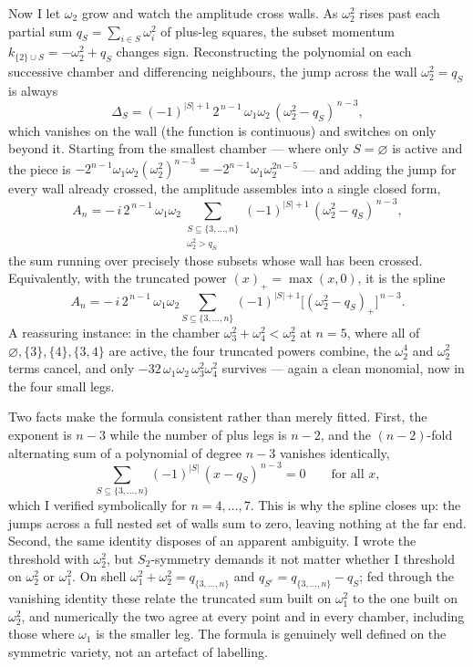 \documentclass[11pt]{article}
\begin{document}
Now I let $\omega_2$ grow and watch the amplitude cross walls. As $\omega_2^2$ rises past each
partial sum $q_S=\sum_{i\in S}\omega_i^2$ of plus-leg squares, the subset momentum
$k_{\{2\}\cup S}=-\omega_2^2+q_S$ changes sign. Reconstructing the polynomial on each successive
chamber and differencing neighbours, the jump across the wall $\omega_2^2=q_S$ is always
\[
\Delta_S=(-1)^{|S|+1}\,2^{\,n-1}\,\omega_1\omega_2\,(\omega_2^2-q_S)^{\,n-3},
\]
which vanishes on the wall (the function is continuous) and switches on only beyond it. Starting
from the smallest chamber --- where only $S=\varnothing$ is active and the piece is
$-2^{n-1}\omega_1\omega_2(\omega_2^2)^{n-3}=-2^{n-1}\omega_1\omega_2^{2n-5}$ --- and adding the
jump for every wall already crossed, the amplitude assembles into a single closed form,
\[
A_n=-\,i\,2^{\,n-1}\,\omega_1\omega_2
\sum_{\substack{S\subseteq\{3,\dots,n\}\\ \omega_2^2>q_S}}
(-1)^{|S|+1}\,(\omega_2^2-q_S)^{\,n-3},
\]
the sum running over precisely those subsets whose wall has been crossed. Equivalently, with the
truncated power $(x)_+=\max(x,0)$, it is the spline
\[
A_n=-\,i\,2^{\,n-1}\,\omega_1\omega_2
\sum_{S\subseteq\{3,\dots,n\}}(-1)^{|S|+1}\big[(\omega_2^2-q_S)_+\big]^{\,n-3}.
\]
A reassuring instance: in the chamber $\omega_3^2+\omega_4^2<\omega_2^2$ at $n=5$, where all of
$\varnothing,\{3\},\{4\},\{3,4\}$ are active, the four truncated powers combine, the $\omega_2^4$
and $\omega_2^2$ terms cancel, and only $-32\,\omega_1\omega_2\,\omega_3^2\omega_4^2$ survives ---
again a clean monomial, now in the four small legs.

Two facts make the formula consistent rather than merely fitted. First, the exponent is $n-3$
while the number of plus legs is $n-2$, and the $(n-2)$-fold alternating sum of a polynomial of
degree $n-3$ vanishes identically,
\[
\sum_{S\subseteq\{3,\dots,n\}}(-1)^{|S|}\,(x-q_S)^{\,n-3}=0\qquad\text{for all }x,
\]
which I verified symbolically for $n=4,\dots,7$. This is why the spline closes up: the jumps
across a full nested set of walls sum to zero, leaving nothing at the far end. Second, the same
identity disposes of an apparent ambiguity. I wrote the threshold with $\omega_2^2$, but
$S_2$-symmetry demands it not matter whether I threshold on $\omega_2^2$ or $\omega_1^2$. On shell
$\omega_1^2+\omega_2^2=q_{\{3,\dots,n\}}$ and $q_{S^c}=q_{\{3,\dots,n\}}-q_S$; fed through the
vanishing identity these relate the truncated sum built on $\omega_1^2$ to the one built on
$\omega_2^2$, and numerically the two agree at every point and in every chamber, including those
where $\omega_1$ is the smaller leg. The formula is genuinely well defined on the symmetric
variety, not an artefact of labelling.
\end{document}

